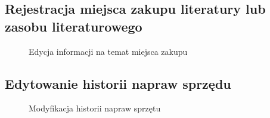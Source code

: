 \subsection{Rejestracja miejsca zakupu literatury lub zasobu literaturowego}
\begin{figure}[H]
	\centering
        \vfill
        \noindent
	\caption{Edycja informacji na temat miejsca zakupu}
\end{figure}

\subsection{Edytowanie historii napraw sprzędu}
\begin{figure}[H]
	\centering
        \vfill
        \noindent
	\caption{Modyfikacja historii napraw sprzętu}
\end{figure}

